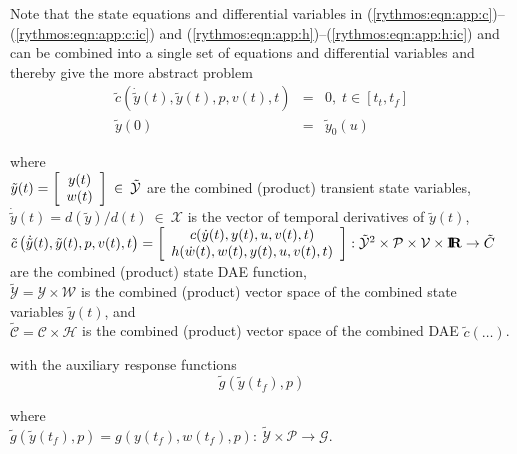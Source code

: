 \documentclass[pdf,ps2pdf,11pt]{SANDreport}
\begin{document}
Note that the state equations and differential variables in
(\ref{rythmos:eqn:app:c})--(\ref{rythmos:eqn:app:c:ic}) and
(\ref{rythmos:eqn:app:h})--(\ref{rythmos:eqn:app:h:ic}) and can be combined
into a single set of equations and differential variables and thereby give
the more abstract problem
%
\begin{eqnarray}
\tilde{c}\left( \dot{\tilde{y}}(t), \tilde{y}(t), p, v(t), t \right) & = & 0,
\; t \in \left[ t_t, t_f \right] \label{rythmos:eqn:app:c_tilde} \\
\tilde{y}(0) & = & \tilde{y}_0(u) \label{rythmos:eqn:app:c_tilde:ic}
\end{eqnarray}
\begin{tabbing}
\hspace{4ex}where\hspace{1ex}\= \\
\>	$\tilde{y}(t) = {\bmat{c} y(t) \\ w(t) \emat} \:\in\:\tilde{\mathcal{Y}}$ are the combined (product) transient state variables, \\
\>	$\dot{\tilde{y}}(t) = d(\tilde{y})/d(t)\:\in\:\mathcal{X}$ is the vector of temporal derivatives of $\tilde{y}(t)$, \\
\>	$\tilde{c}\left( \dot{\tilde{y}}(t), \tilde{y}(t), p, v(t), t \right) =
		{\bmat{c} c(\dot{y}(t),y(t),u,v(t),t) \\ h(\dot{w}(t),w(t),y(t),u,v(t),t) \emat}
		: \tilde{\mathcal{Y}}^2 \times \mathcal{P} \times \mathcal{V} \times \RE \rightarrow \tilde{C}$ \\
\>	\hspace{4ex} are the combined (product) state DAE function, \\
\>	$\tilde{\mathcal{Y}} = \mathcal{Y} \times \mathcal{W}$ is the combined (product) vector space of the combined state variables $\tilde{y}(t)$, and \\
\>	$\tilde{\mathcal{C}} = \mathcal{C} \times \mathcal{H}$ is the combined (product) vector space of the combined DAE $\tilde{c}(\ldots)$.
\end{tabbing}
%
with the auxiliary response functions
%
%
\begin{equation}
\tilde{g}(\tilde{y}(t_f),p)
\label{rythmos:eqn:app:g_tilde}
\end{equation}
\begin{tabbing}
\hspace{4ex}where\hspace{1ex}\= \\
\>	$\tilde{g}(\tilde{y}(t_f),p) = g(y(t_f),w(t_f),p) : \:
		\tilde{\mathcal{Y}} \times \mathcal{P}
		\rightarrow \mathcal{G}$.
\end{tabbing}
\end{document}
